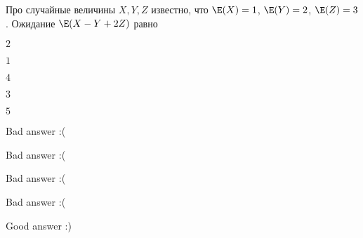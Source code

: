 
\begin{question}
Про случайные величины \(X, Y, Z\) известно, что \(\E(X)=1\),
\(\E(Y)=2\), \(\E(Z)=3\). Ожидание \(\E(X-Y+2Z)\) равно
\begin{answerlist}
  \item \(2\)
  \item \(1\)
  \item \(4\)
  \item \(3\)
  \item \(5\)
\end{answerlist}
\end{question}

\begin{solution}
\begin{answerlist}
  \item Bad answer :(
  \item Bad answer :(
  \item Bad answer :(
  \item Bad answer :(
  \item Good answer :)
\end{answerlist}
\end{solution}

